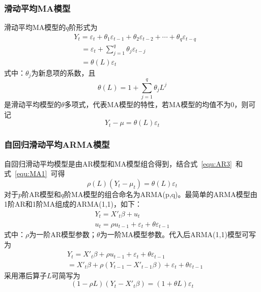\subsubsection{滑动平均MA模型}

滑动平均MA模型的$q$阶形式为
\begin{align}
  \label{equ:mama}
  & {{Y}_{t}}={{\varepsilon }_{t}}+{{\theta }_{1}}{{\varepsilon }_{t-1}}+{{\theta }_{2}}{{\varepsilon }_{t-2}}+\cdots +{{\theta }_{q}}{{\varepsilon }_{t-q}} \nonumber \\ 
 & \quad ={{\varepsilon }_{t}}+\sum\limits_{j=1}^{q}{{{\theta }_{j}}{{\varepsilon }_{t-j}}} \\ 
 & \quad =\theta (L){{\varepsilon }_{t}} \nonumber
\end{align}
式中：${\theta }_{j}$为新息项的系数，且
\begin{equation}
	\theta (L)=1+\sum\limits_{j=1}^{q}{{{\theta }_{j}}{{L}^{j}}}
\end{equation}
是滑动平均模型的${\theta }$多项式，代表MA模型的特性，若MA模型的均值不为0，则可记
\begin{equation}
	\label{equ:MA1}
	{{Y}_{t}}-\mu =\theta (L){{\varepsilon }_{t}}
\end{equation}

\subsubsection{自回归滑动平均ARMA模型}

自回归滑动平均模型是由AR模型和MA模型组合得到，结合式~\ref{equ:AR3}~和式~\ref{equ:MA1}~可得
\begin{equation}
	\rho (L)({{Y}_{t}}-{{\mu }_{t}})=\theta (L){{\varepsilon }_{t}}
\end{equation}
对于$p$阶AR模型和$q$阶MA模型的组合命名为ARMA(p,q)。最简单的ARMA模型由1阶AR和1阶MA组成的ARMA(1,1)，如下：
\begin{gather}
 	{{Y}_{t}}={{{{X}'}}_{t}}\beta +{{u}_{t}} \\ 
	{{u}_{t}}=\rho {{u}_{t-1}}+{{\varepsilon }_{t}}+\theta {{\varepsilon }_{t-1}}
\end{gather}
式中：$\rho$为一阶AR模型参数；$\theta$为一阶MA模型参数。代入后ARMA(1,1)模型可写为
\begin{align}
  & {{Y}_{t}}={{{{X}'}}_{t}}\beta +\rho {{u}_{t-1}}+{{\varepsilon }_{t}}+\theta {{\varepsilon }_{t-1}} \\ 
 & ={{{{X}'}}_{t}}\beta +\rho ({{Y}_{t-1}}-{{{{X}'}}_{t-1}}\beta )+{{\varepsilon }_{t}}+\theta {{\varepsilon }_{t-1}}
\end{align}
采用滞后算子$L$可简写为
\begin{equation}
	(1-\rho L)({{Y}_{t}}-{{{X}'}_{t}}\beta )=(1+\theta L){{\varepsilon }_{t}}
\end{equation}

